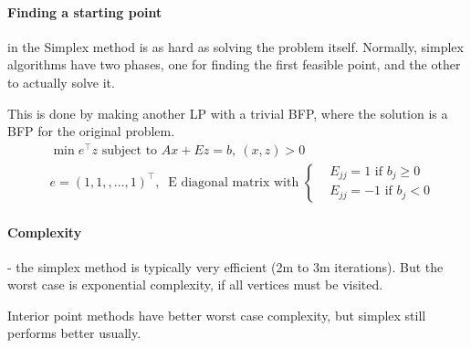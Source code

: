 \documentclass{article}
\begin{document}
\paragraph{Finding a starting point} in the Simplex method is as hard as solving the problem itself. 
Normally, simplex algorithms have two phases, one for finding the first feasible point, and the other to actually solve it. 

This is done by making another LP with a trivial BFP, where the solution is a BFP for the original problem. 
\begin{align*}
  &\min e^{\top}z \text{ subject to } Ax + Ez = b,\ (x,z) > 0 \\ 
  &e = (1,1,,\dots,1)^{\top},\  \text{ E diagonal matrix with }\left\{
    \begin{aligned}
      &E_{jj} = 1 \text{ if } b_j \geq 0 \\ 
      &E_{jj} = -1 \text{ if } b_j < 0  
    \end{aligned}
  \right.
\end{align*}

\paragraph{Complexity}- the simplex method is typically very efficient (2m to 3m  iterations). But the worst case is exponential complexity, if all vertices must be visited.

Interior point methods have better worst case complexity, but simplex still performs better usually. 
\end{document}
